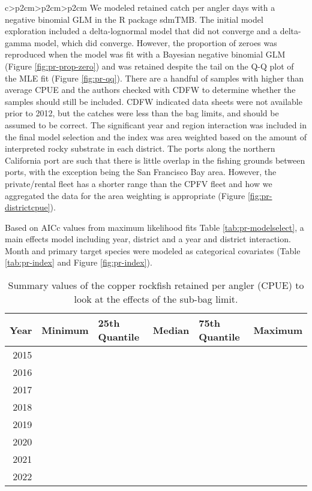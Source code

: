 \documentclass[11pt,
  letterpaper,
]{article}
\begin{document}
\begin{longtable}[t]{c>{\centering\arraybackslash}p{2cm}>{\centering\arraybackslash}p{2cm}>{\centering\arraybackslash}p{2cm}}
We modeled retained catch per angler days with a negative binomial GLM in the R package sdmTMB. The initial model exploration included a delta-lognormal model that did not converge and a delta-gamma model, which did converge. However, the proportion of zeroes was reproduced when the model was fit with a Bayesian negative binomial GLM (Figure \ref{fig:pr-prop-zero}) and was retained despite the tail on the Q-Q plot of the MLE fit (Figure \ref{fig:pr-qq}). There are a handful of samples with higher than average CPUE and the authors checked with CDFW to determine whether the samples should still be included. CDFW indicated data sheets were not available prior to 2012, but the catches were less than the bag limits, and should be assumed to be correct. The significant year and region interaction was included in the final model selection and the index was area weighted based on the amount of interpreted rocky substrate in each district. The ports along the northern California port are such that there is little overlap in the fishing grounds between ports, with the exception being the San Francisco Bay area. However, the private/rental fleet has a shorter range than the CPFV fleet and how we aggregated the data for the area weighting is appropriate (Figure \ref{fig:pr-districtcpue}).

Based on AICc values from maximum likelihood fits Table \ref{tab:pr-modelselect}, a main effects model including year, district and a year and district interaction. Month and primary target species were modeled as categorical covariates (Table \ref{tab:pr-index} and Figure \ref{fig:pr-index}).

\begin{table}[H]
\centering\centering\centering
\caption{\label{tab:pr-cpue}Summary values of the copper rockfish retained per angler (CPUE) to look at the effects of the sub-bag limit.}
\centering
\fontsize{10}{12}\selectfont
\fontsize{10}{12}\selectfont
\begin{tabular}[t]{r>{\raggedleft\arraybackslash}p{1.33cm}>{\raggedleft\arraybackslash}p{1.33cm}>{\raggedleft\arraybackslash}p{1.33cm}>{\raggedleft\arraybackslash}p{1.33cm}>{\raggedleft\arraybackslash}p{1.33cm}}
\toprule
Year & Minimum & 25th Quantile & Median & 75th Quantile & Maximum\\
\midrule
2015 & 0.125 & 0.500 & 0.667 & 1.25 & 10.000\\
2016 & 0.143 & 0.500 & 0.667 & 1.50 & 10.000\\
2017 & 0.111 & 0.500 & 1.000 & 2.00 & 10.000\\
2018 & 0.143 & 0.500 & 1.000 & 1.60 & 20.000\\
2019 & 0.111 & 0.500 & 0.917 & 1.50 & 10.000\\
2020 & 0.167 & 0.500 & 0.667 & 1.00 & 7.500\\
2021 & 0.111 & 0.500 & 0.667 & 1.25 & 8.571\\
2022 & 0.125 & 0.333 & 0.500 & 1.00 & 6.333\\
\bottomrule
\end{tabular}
\end{table}


\end{longtable}
\end{document}

